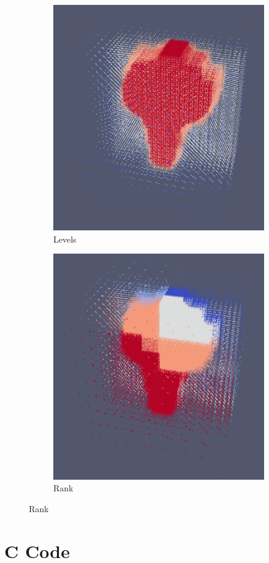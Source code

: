 \documentclass[12pt,letterpaper]{article}
\begin{document}
\begin{figure}[ht]
\centering
\caption{Octree}
\label{octree}
\begin{subfigure}[b]{0.4\textwidth}
\caption{Levels}
\label{oct_levels}
\includegraphics[width=\textwidth]{oct_level.png}
\end{subfigure}
\begin{subfigure}[b]{0.4\textwidth}
\caption{Rank}
\label{oct_rank}
\includegraphics[width=\textwidth]{oct_rank.png}
\end{subfigure}
\end{figure}

\section{C Code}


\end{document}
